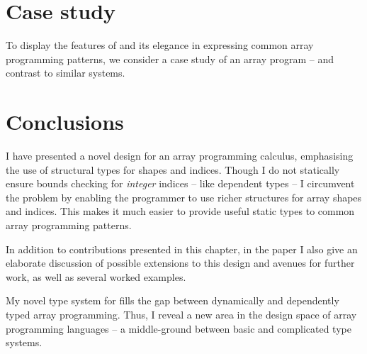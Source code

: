 \section{Case study}

To display the features of \starr{} and its elegance in expressing common array programming patterns, we consider a case study of an array program -- and contrast to similar systems.

\section{Conclusions}

I have presented a novel design for an array programming calculus, emphasising the use of structural types for shapes and indices. 
Though I do not statically ensure bounds checking for \emph{integer} indices -- like dependent types -- I circumvent the problem by enabling the programmer to use richer structures for array shapes and indices. 
This makes it much easier to provide useful static types to common array programming patterns. 

In addition to contributions presented in this chapter, in the paper \cite{star} I also give an elaborate discussion of possible extensions to this design and avenues for further work, as well as several worked examples.

My novel type system for \starr{} fills the gap between dynamically and dependently typed array programming. Thus, I reveal a new area in the design space of array programming languages -- a middle-ground between basic and complicated type systems.

